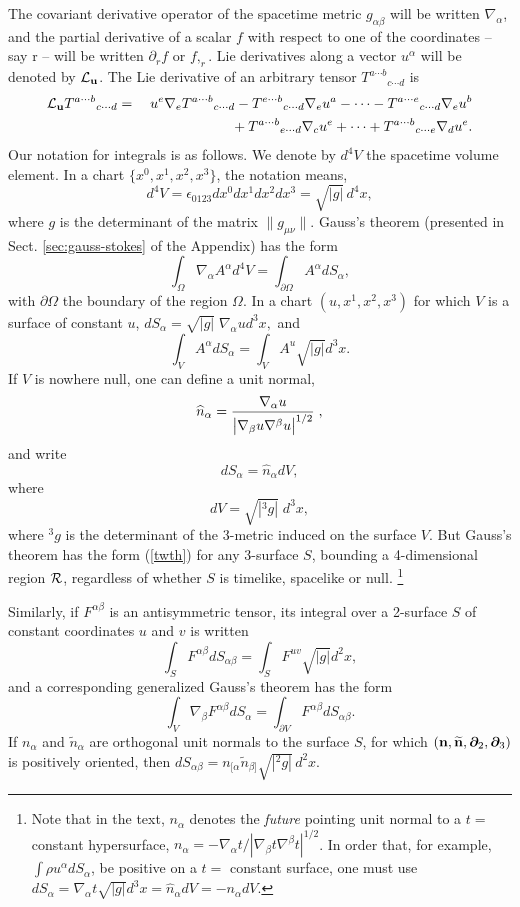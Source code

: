 \documentclass[12pt]{article}
\def\a{\alpha}
\def\b{\beta}
\def\be{\begin{equation}}
\def\ee{\end{equation}}
\def\ba{\begin{eqnarray}}
\def\ea{\end{eqnarray}}
\newcommand{\na}{\nabla}
\def\a{\alpha}
\def\b{\beta}
\begin{document}
The covariant derivative operator of the spacetime metric
$g_{\alpha\beta}$ will be written $\nabla_\alpha$, and the partial
derivative of a scalar $f$
with respect to one of the coordinates -- say r -- will be written
$\partial_r f$ or $f,_r$.  Lie derivatives along a vector $u^\alpha$
will be denoted by ${\cal L}_{\bf u}$.  The Lie derivative of an
arbitrary
tensor $T^{a\cdots b}{}_{c\cdots d}$ is
\ba
{\cal L}_{\bf u} T^{a\cdots b}{}_{c\cdots d} &=&
u^e\nabla_e T^{a\cdots b}{}_{c\cdots d}
-T^{e\cdots b}{}_{c\cdots d}\nabla_e u^a
- \cdots
- T^{a\cdots e}{}_{c\cdots d}\nabla_e u^b
 \nonumber \\
&&\phantom{u^e\nabla_e T^{a\cdots b}{}_{c\cdots d}}
+ T^{a\cdots b}{}_{e\cdots d}\nabla_c u^e+ \cdots
+ T^{a\cdots b}{}_{c\cdots e}\nabla_d u^e. \label{Lieiii}
\ea
Our notation for integrals is as follows.  We denote by $d^4V$ the
spacetime volume element.  In a chart $\{x^0, x^1, x^2, x^3\}$, the
notation 
means,
\be
d^4V = \epsilon_{0123} dx^0 dx^1 dx^2 dx^3 = \sqrt{|g|}\, d^4x,
\label{dtauii}
\ee
where $g$ is the determinant of the matrix $\|g_{\mu\nu}\|$. 
Gauss's theorem (presented in Sect. \ref{sec:gauss-stokes} of the Appendix) has the form
\be
\int_{\Omega} \nabla_\alpha A^\alpha d^4V= \int_{\partial\Omega} A^\alpha 
dS_\alpha,
\label{twth}
\ee 
with $\partial\Omega$ the boundary of the region $\Omega$. 
In a chart $(u, x^1, x^2, x^3)$ for which $V$ is a surface of
constant $u$, $ dS_\alpha = \sqrt{|g|}\; \nabla_\alpha u d^3x,$ and
\be
\int_V A^\alpha dS_\alpha = \int_V A^u \sqrt{|g|} d^3x  .\label{dSaii}
\ee
If $V$ is nowhere null, one can define a unit normal,
\be
\widehat n_\alpha = {{\nabla_\alpha u}\over{\big|\nabla_\beta u \nabla^\beta
u\big|^{1/2}}}\;,\label{na}
\ee
and write
\be  dS_\alpha = \widehat n_\alpha dV,
\ee
where
\be dV = \sqrt{|^3g|}\;d^3x,\label{dSaiii}
\ee
where ${}^3g$ is the determinant of the 3-metric induced on the surface $V$.
But Gauss's theorem has the form (\ref{twth})
for any 3-surface $S$, bounding a 4-dimensional region
${\cal R}$, regardless of whether $S$ is timelike, spacelike or null.%
\footnote{
Note that in the text, $n_\a$ denotes the {\em future} pointing unit normal
to a $t=$ constant hypersurface, $n_\a = -\na_\a t/|\na_\b t\na^\b t|^{1/2}$. 
In order that, for example, $\int \rho u^\a dS_\a$, be positive on a 
$t=$ constant surface, one must use $dS_\a = \na_\a t \sqrt{|g|}d^3x 
= \widehat n_\a dV = -n_\a dV$.}

Similarly, if $F^{\a\b}$ is an antisymmetric tensor, its integral over 
a 2-surface $S$ of constant coordinates $u$ and $v$ is written
\be
\int_S F^{\a\b} dS_{\a\b} = \int_S F^{uv} \sqrt{|g|}d^2 x,
\label{dSab}
\ee
and a corresponding generalized Gauss's theorem has the form
\be
\int_V \na_\b F^{\a\b} dS_\a = \int_{\partial V} F^{\a\b} dS_{\a\b}.
\label{eq:gauss0}
\ee
If $n_\a$ and $\widetilde n_\a$ are orthogonal unit normals to the 
surface $S$, for which $({\bf n, \widetilde n}, \bm\partial_2, \bm\partial_3)$ 
is positively oriented, then $dS_{\a\b} = n_{[\a}\widetilde n_{\b]} \sqrt{|^2g|}\, d^2x$.
\end{document}
